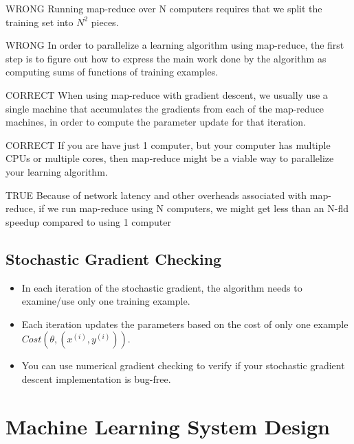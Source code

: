 \documentclass[11pt]{article} %
\begin{document}
\item WRONG Running map-reduce over N computers requires that we split the training set into $N^2$ pieces.

\item WRONG In order to parallelize a learning algorithm using map-reduce, the first step is to figure out how to express the main work done by the algorithm as computing sums of functions of training examples.


\item CORRECT  When using map-reduce with gradient descent, we usually use a single machine that accumulates the gradients from each of the map-reduce machines, in order to compute the parameter update for that iteration.


\item CORRECT  If you are have just 1 computer, but your computer has multiple CPUs or multiple cores, then map-reduce might be a viable way to parallelize your learning algorithm.


TRUE Because of network latency and other overheads associated with map-reduce, if we run map-reduce using N computers, we might get less than an N-fld speedup compared to using 1 computer




\newpage

\subsection*{Stochastic Gradient Checking}

\begin{itemize}
	\item In each iteration of the stochastic gradient, the algorithm needs to examine/use only one training example.
	\item Each iteration updates the parameters based on the cost of only one example $ Cost (\theta,(x^{(i)},y^{(i)}))$.
	\item You can use numerical gradient checking to verify if your stochastic gradient descent implementation is bug-free.
\end{itemize}
\section*{Machine Learning System Design}
\end{document}
